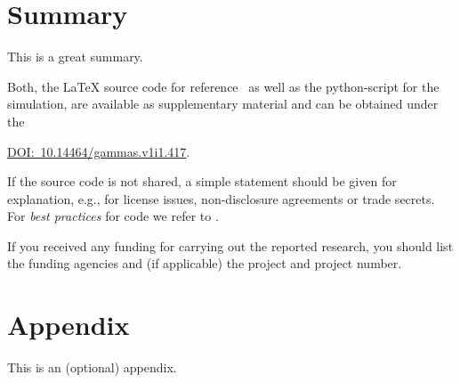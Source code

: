 \documentclass[usebibtex]{gammas}
\theoremstyle{definition}
\begin{document}
\section{Summary}
This is a great summary. 

\begin{gammacode}
	Both, the \LaTeX{} source code for reference~\cite{kern2019gammas} as well as the python-script for the simulation, are available as supplementary material and can be obtained under the
	\begin{center}
	 	\href{https://doi.org/10.14464/gammas.v1i1.417}{DOI:~10.14464/gammas.v1i1.417}.
	\end{center}
	If the source code is not shared, a simple statement should be given for explanation, e.g., for license issues, non-disclosure agreements or trade secrets. For \emph{best practices} for code we refer to \cite{fehr2016best}.
\end{gammacode}

\begin{gammacknowledgement}
	If you received any funding for carrying out the reported research, you should list the funding agencies and (if applicable) the project and project number.
\end{gammacknowledgement}

\appendix

\section{Appendix}
This is an (optional) appendix.

\end{document}
